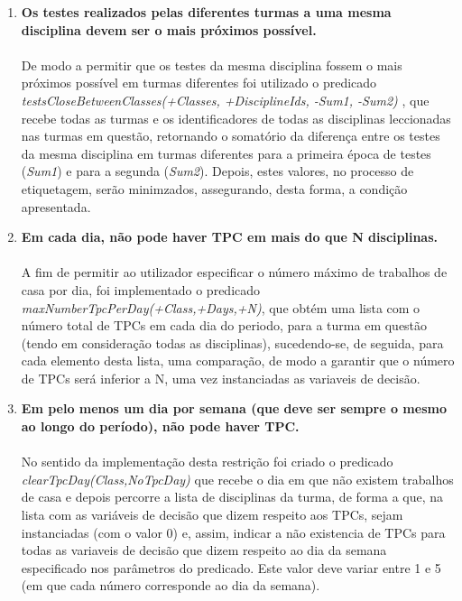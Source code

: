 \documentclass{llncs}
\begin{document}
\begin{enumerate}
	\item \textbf{Os testes realizados pelas diferentes turmas a uma mesma disciplina devem ser o mais próximos possível.} \\\\
		De modo a permitir que os testes da mesma disciplina fossem o mais próximos possível em turmas diferentes foi utilizado o predicado  \textit{testsCloseBetweenClasses(+Classes, +DisciplineIds, -Sum1, -Sum2)} , 
		que recebe todas as turmas e os identificadores de todas as disciplinas leccionadas nas turmas em questão, retornando o somatório da diferença entre os testes da mesma disciplina em turmas diferentes para a 
		primeira época de testes (\textit{Sum1}) e para a segunda 
		(\textit{Sum2}). Depois, estes valores, no processo de etiquetagem, serão minimzados, assegurando, desta forma, a condição apresentada.
		\\

	\item \textbf{Em cada dia, não pode haver TPC em mais do que N disciplinas.} \\\\
		A fim de permitir ao utilizador especificar o número máximo de trabalhos de casa por dia, foi implementado o predicado \textit{maxNumberTpcPerDay(+Class,+Days,+N)}, que obtém uma lista com o número total de TPCs em cada dia do periodo, para a turma em questão (tendo em consideração todas as disciplinas), sucedendo-se, de seguida, para cada elemento desta lista, uma comparação, 
		de modo a garantir que o número de TPCs será inferior a N, uma vez instanciadas as variaveis de decisão.
		\\

	\item \textbf{Em pelo menos um dia por semana (que deve ser sempre o mesmo ao longo do período), não pode haver TPC.} \\\\
		No sentido da implementação desta restrição foi criado o predicado \textit{clearTpcDay(Class,NoTpcDay)} que recebe o dia em que não existem trabalhos de casa e depois percorre a lista de disciplinas da turma, de forma a que, na lista com as variáveis de decisão que dizem respeito aos TPCs, sejam instanciadas (com o valor 0) e, assim, indicar a não existencia de TPCs para todas as variaveis de decisão que dizem respeito ao dia da 
semana especificado nos parâmetros do predicado. Este valor deve variar entre 1 e 5 (em que cada número corresponde ao dia da semana).
		\\


\end{enumerate}
\end{document}

